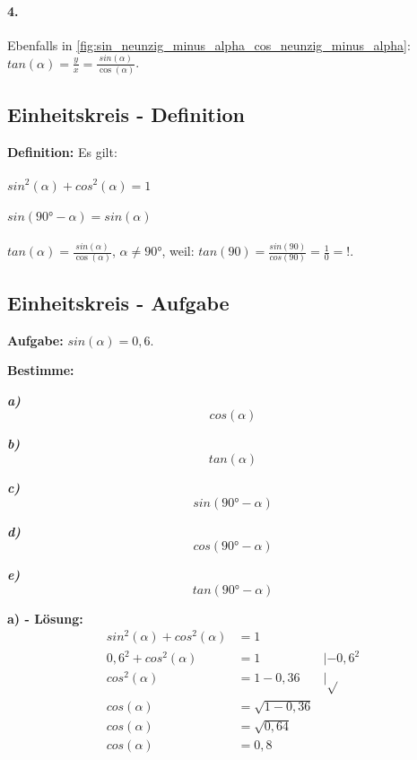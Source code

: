 \documentclass[12pt,a4paper]{article}
\begin{document}
\paragraph{4.}
Ebenfalls in \autoref{fig:sin_neunzig_minus_alpha_cos_neunzig_minus_alpha}:\\
$tan(\alpha) = \frac{y}{x} = \frac{sin(\alpha)}{\cos(\alpha)}$.
\newpage
\subsection{Einheitskreis - Definition}
\textbf{Definition:} Es gilt:
\paragraph{}
$sin^2(\alpha) + cos^2(\alpha) = 1$
\paragraph{}
$sin(90° - \alpha) = sin(\alpha)$
\paragraph{}
$tan(\alpha) = \frac{sin(\alpha)}{\cos(\alpha)}$, $\alpha \neq 90°$, weil:
$tan(90)=\frac{sin(90)}{cos(90)} = \frac{1}{0} = !$.
\subsection{Einheitskreis - Aufgabe}
\textbf{Aufgabe:}
$sin(\alpha) = 0,6$. \\
{\footnotesize
\textbf{Bestimme:}
\begin{multicols}{5}
	\textit{\textbf{a)}}
	\[
		cos(\alpha)
	\]

	\textit{\textbf{b)}}
	\[
		tan(\alpha)
	\]

	\textit{\textbf{c)}}
	\[
		sin(90° - \alpha)
	\]

	\textit{\textbf{d)}}
	\[
		cos(90° - \alpha)
	\]

	\textit{\textbf{e)}}
	\[
		tan(90° - \alpha)
	\]
\end{multicols}
}
\textbf{a) - Lösung:}
\begin{align}
	sin^2(\alpha) + cos^2(\alpha) & = 1 \tag{1}                                    \\
	0,6^2 + cos^2(\alpha)         & = 1                         & |-0,6^2 \tag{2}  \\
	cos^2(\alpha)                 & = 1 - 0,36                  & |\sqrt{} \tag{3} \\
	cos(\alpha)                   & = \sqrt{1 - 0,36}   \tag{4}                    \\
	cos(\alpha)                   & = \sqrt{0,64}   \tag{5}                        \\
	cos(\alpha)                   & = 0,8   \tag{6}
\end{align}
\end{document}
